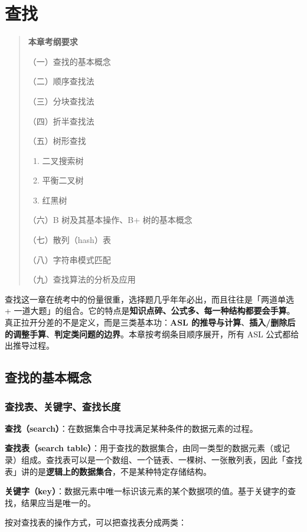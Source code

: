 \documentclass[11pt,openany,UTF8]{ctexbook}
\begin{document}
\chapter{查找}
\begin{quote}
\textbf{本章考纲要求}

（一）查找的基本概念

（二）顺序查找法

（三）分块查找法

（四）折半查找法

（五）树形查找

\begin{enumerate}
\item 二叉搜索树
\item 平衡二叉树
\item 红黑树
\end{enumerate}
（六）B 树及其基本操作、B+ 树的基本概念

（七）散列（hash）表

（八）字符串模式匹配

（九）查找算法的分析及应用

\end{quote}
查找这一章在统考中的份量很重，选择题几乎年年必出，而且往往是「两道单选 + 一道大题」的组合。它的特点是\textbf{知识点碎、公式多、每一种结构都要会手算}。真正拉开分差的不是定义，而是三类基本功：\textbf{ASL 的推导与计算}、\textbf{插入/删除后的调整手算}、\textbf{判定类问题的边界}。本章按考纲条目顺序展开，所有 ASL 公式都给出推导过程。

\section{查找的基本概念}

\subsection{查找表、关键字、查找长度}

\textbf{查找（search）}：在数据集合中寻找满足某种条件的数据元素的过程。

\textbf{查找表（search table）}：用于查找的数据集合，由同一类型的数据元素（或记录）组成。查找表可以是一个数组、一个链表、一棵树、一张散列表，因此「查找表」讲的是\textbf{逻辑上的数据集合}，不是某种特定存储结构。

\textbf{关键字（key）}：数据元素中唯一标识该元素的某个数据项的值。基于关键字的查找，结果应当是唯一的。

按对查找表的操作方式，可以把查找表分成两类：
\end{document}
